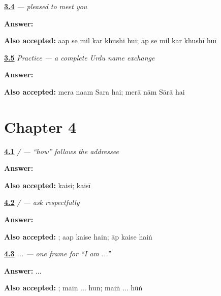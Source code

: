 \noindent\begin{minipage}[t]{\linewidth}
\raggedright
\hyperlink{review-UR-C03-khushi-hui-close}{\textbf{3.4}} \emph{      — pleased to meet you}\par
\small \textbf{Answer:}      \par
\footnotesize \textbf{Also accepted:} aap se mil kar khushi hui; āp se mil kar khushī huī
\end{minipage}\par\medskip

\noindent\begin{minipage}[t]{\linewidth}
\raggedright
\hyperlink{review-UR-C03-practice-next-line}{\textbf{3.5}} \emph{Practice — a complete Urdu name exchange}\par
\small \textbf{Answer:}    \par
\footnotesize \textbf{Also accepted:} mera naam Sara hai; merā nām Sārā hai
\end{minipage}\par\medskip

\section*{Chapter 4}

\noindent\begin{minipage}[t]{\linewidth}
\raggedright
\hyperlink{review-UR-C04-kaise-kaisi-woman}{\textbf{4.1}} \emph{ /  — “how” follows the addressee}\par
\small \textbf{Answer:} \par
\footnotesize \textbf{Also accepted:} kaisi; kaisī
\end{minipage}\par\medskip

\noindent\begin{minipage}[t]{\linewidth}
\raggedright
\hyperlink{review-UR-C04-aap-kaise-hain-man}{\textbf{4.2}} \emph{   /    — ask respectfully}\par
\small \textbf{Answer:}   \par
\footnotesize \textbf{Also accepted:}   ; aap kaise hain; āp kaise haiṅ
\end{minipage}\par\medskip

\noindent\begin{minipage}[t]{\linewidth}
\raggedright
\hyperlink{review-UR-C04-main-hun-frame}{\textbf{4.3}} \emph{ ...  — one frame for “I am ...”}\par
\small \textbf{Answer:}  ... \par
\footnotesize \textbf{Also accepted:}   ; main ... hun; maiṅ ... hūṅ
\end{minipage}\par\medskip

